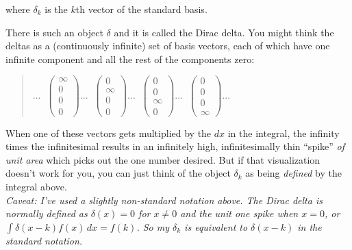 \documentclass{article}
\newcommand{\cviiii}[4]
    {\left(\begin{array}{c}#1\\#2\\#3\\#4\end{array}\right)}
\def\p{ \vspace{10pt}\\ }
\begin{document}
where $\delta_k$ is the $k$th vector of the standard basis.

\pagebreak

There is such an object $\delta$ and it is called the Dirac delta.
You might think the deltas as a
(continuously infinite) set of basis vectors, each of which have one
infinite component and all the rest of the components zero: 

\vspace{6pt}
\begin{quote} 
$
... \;\; 
\cviiii{\infty}{0}{0}{0} ...\;\; 
\cviiii{0}{\infty}{0}{0} ...\;\;
\cviiii{0}{0}{\infty}{0} ...\;\; 
\cviiii{0}{0}{0}{\infty} ...
$
\end{quote} 
\vspace{6pt}
When one of these vectors gets multiplied by the $dx$ in the integral,
the infinity times the infinitesimal results in an infinitely high,
infinitesimally thin ``spike'' {\it of unit area} which picks out the
one number desired.
But if that visualization doesn't work for you, you can just think of
the object $\delta_k$ as being {\it defined} by the integral above.
\p
{\it Caveat: I've used a slightly non-standard notation above. The Dirac
delta is normally defined as $\delta(x) = 0$ for $x\neq 0$ and the unit
one spike when $x=0$, or $\int \delta(x-k) f(x)\, dx = f(k)$. So my
$\delta_k$ is equivalent to $\delta(x-k)$ in the standard notation.}
\end{document}
